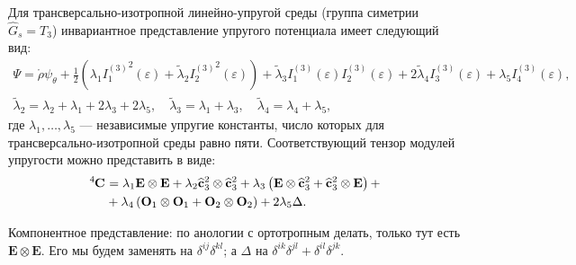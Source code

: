

Для трансверсально-изотропной линейно-упругой среды (группа симетрии $\hat{G}_{s} = T_3$) инвариантное представление упругого потенциала имеет следующий вид:
\begin{gather}
	\Psi = \mathring{\rho} \psi_\theta + \frac{1}{2} \left(\lambda_1 {I^{(3)}_1}^2(\varepsilon) + \widetilde{\lambda}_2 {I^{(3)}_2}^2(\varepsilon)\right) + \widetilde{\lambda}_3 I^{(3)}_{1}(\varepsilon)I^{(3)}_2(\varepsilon) + 2 \widetilde{\lambda}_4 I^{(3)}_3(\varepsilon) + \lambda_5 I_4^{(3)}(\varepsilon), \\
	\widetilde{\lambda}_2 = \lambda_2 + \lambda_1 + 2 \lambda_3 + 2 \lambda_5, \quad \widetilde{\lambda}_3 = \lambda_1 + \lambda_3, \quad \widetilde{\lambda}_4 = \lambda_4 + \lambda_5,\nonumber
\end{gather}
где $\lambda_1, \dots, \lambda_5$ --- независимые упругие константы, число которых для трансверсально-изотропной среды равно пяти. Соответствующий тензор модулей упругости можно представить в виде:
\begin{align}
	\tensor[^4]{\mathbf{C}}{} &= \lambda_1 \mathbf{E} \otimes \mathbf{E} + \lambda_2 \widehat{\mathbf{c}}^2_3 \otimes \widehat{\mathbf{c}}^2_3 + \lambda_3 \left(\mathbf{E} \otimes \widehat{\mathbf{c}}^2_3 + \widehat{\mathbf{c}}^2_3 \otimes \mathbf{E}\right) + \\ &+ \lambda_4 \left(\mathbf{O}_1 \otimes \mathbf{O}_1 + \mathbf{O}_2 \otimes \mathbf{O}_2\right) + 2 \lambda_5 \Delta.\nonumber 
\end{align}

Компонентное представление: по анологии с ортотропным делать, только тут есть $\mathbf{E} \otimes \mathbf{E}$. Его мы будем заменять на $\delta^{ij} \delta^{kl}$; а $\Delta$ на $\delta^{ik}\delta^{jl} + \delta^{il} \delta^{jk}$. 

